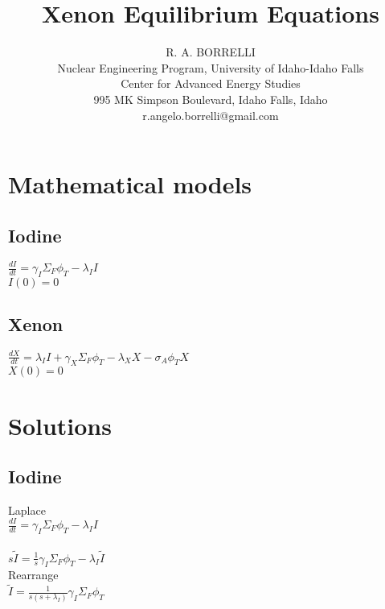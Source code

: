 \documentclass[11pt,a4paper]{article}
\begin{document}
\begin{titlepage}
            \title{Xenon Equilibrium Equations}
            \author{
                R. A. BORRELLI \\
                Nuclear Engineering Program, University of Idaho-Idaho Falls \\
                Center for Advanced Energy Studies \\
                995 MK Simpson Boulevard, Idaho Falls, Idaho \\
                r.angelo.borrelli@gmail.com
            }
\clearpage %
\maketitle
\thispagestyle{empty} %
\end{titlepage}

\section{Mathematical models}
\subsection{Iodine}
$\frac{dI}{dt}=\gamma_I \Sigma_F \phi_T-\lambda_I I$ \\
$I(0)=0$

\subsection{Xenon}
$\frac{dX}{dt}=\lambda_I I + \gamma_X \Sigma_F \phi_T - \lambda_X X - \sigma_A \phi_T X$ \\
$X(0)=0$

\newpage

\section{Solutions}
\subsection{Iodine}
Laplace \\
$\frac{dI}{dt}=\gamma_I \Sigma_F \phi_T-\lambda_I I$ \\ \\
$s\tilde{I}=\frac{1}{s}\gamma_I\Sigma_F\phi_T-\lambda_I\tilde{I}$ \\

\noindent Rearrange \\
$\tilde{I}=\frac{1}{s(s+\lambda_I)}\gamma_I\Sigma_F\phi_T$ \\
\end{document}
